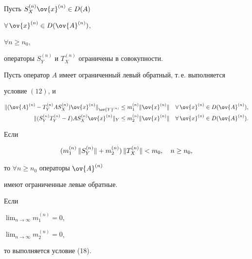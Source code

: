 \begin{thm}


Пусть $S^{(n)}_X\ov{x}^{(n)}\in D(A)$


$\forall\,\ov{x}^{(n)}\in D(\ov{A}^{(n)})$,


$\forall n\ge n_0$,


операторы $S^{(n)}_Y$ и $T^{(n)}_X$ ограничены в совокупности.


Пусть оператор $A$ имеет ограниченный левый обратный, т.\,е. выполняется


условие $(12)$, и


\begin{align*}


\nr{(\ov{A}^{(n)}-T^{(n)}_YAS^{(n)}_X)\ov{x}^{(n)}}_{\ov{Y}^{(n)}} &\le


m^{(n)}_1\nr{\ov{x}^{(n)}}


\quad \forall\,\ov{x}^{(n)}\in D(\ov{A}^{(n)}), \\


%


\nr{(S^{(n)}_YT^{(n)}_Y-I)AS^{(n)}_X\ov{x}^{(n)}}_Y &\le


m^{(n)}_2\nr{\ov{x}^{(n)}}


\quad \forall\,\ov{x}^{(n)}\in D(\ov{A}^{(n)}).


\end{align*}


Если


\begin{equation}


(m^{(n)}_1\,\nr{S^{(n)}_Y}+m^{(n)}_2)\, \nr{T^{(n)}_X}<m_0, \quad n\ge n_0,


\end{equation}


то $\forall n\ge n_0$ операторы $\ov{A}^{(n)}$


имеют ограниченные левые обратные.


\end{thm}





\begin{notenonum} Если


$\lim_{n\to\infty}m^{(n)}_1=0$,


$\lim_{n\to\infty}m^{(n)}_2=0$,


то выполняется условие (18).


\end{notenonum}






